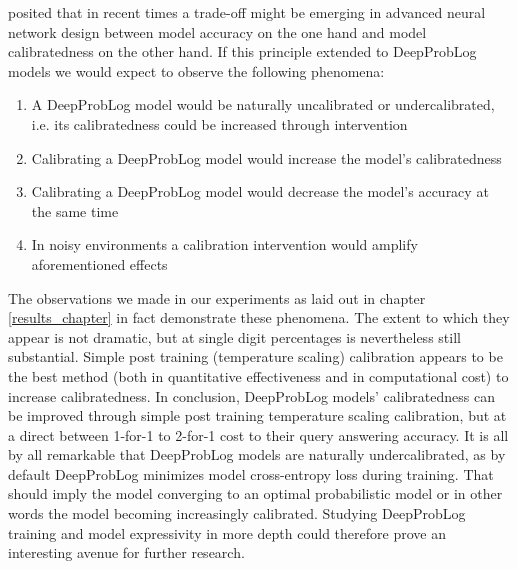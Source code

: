 \cite{guo2017calibration} posited that in recent times a trade-off might be emerging in advanced neural network design between model accuracy on the one hand and model calibratedness on the other hand. If this principle extended to DeepProbLog models we would expect to observe the following phenomena:
\begin{enumerate}
  \item A DeepProbLog model would be naturally uncalibrated or undercalibrated, i.e. its calibratedness could be increased through intervention
  \item Calibrating a DeepProbLog model would increase the model's calibratedness
  \item Calibrating a DeepProbLog model would decrease the model's accuracy at the same time
  \item In noisy environments a calibration intervention would amplify aforementioned effects
\end{enumerate}
The observations we made in our experiments as laid out in chapter \ref{results_chapter} in fact demonstrate these phenomena. The extent to which they appear is not dramatic, but at single digit percentages is nevertheless still substantial. Simple post training (temperature scaling) calibration appears to be the best method (both in quantitative effectiveness and in computational cost) to increase calibratedness.
In conclusion, DeepProbLog models' calibratedness can be improved through simple post training temperature scaling calibration, but at a direct between 1-for-1 to 2-for-1 cost to their query answering accuracy. It is all by all remarkable that DeepProbLog models are naturally undercalibrated, as by default DeepProbLog minimizes model cross-entropy loss during training. That should imply the model converging to an optimal probabilistic model or in other words the model becoming increasingly calibrated. Studying DeepProbLog training and model expressivity in more depth could therefore prove an interesting avenue for further research.